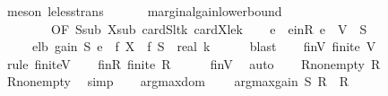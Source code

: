 \begin{isabellebody}
\ {\isacharparenleft}{\kern0pt}meson\ le{\isacharunderscore}{\kern0pt}less{\isacharunderscore}{\kern0pt}trans{\isacharparenright}{\kern0pt}\isanewline
\ \ \isamarkupfalse%
\isanewline
\isanewline
\ \ \isamarkupfalse%
\ marginal{\isacharunderscore}{\kern0pt}gain{\isacharunderscore}{\kern0pt}lower{\isacharunderscore}{\kern0pt}bound{\isacharbrackleft}{\kern0pt}\isanewline
\ \ \ \ \ \ \ \ OF\ S{\isacharunderscore}{\kern0pt}sub{\isacharprime}{\kern0pt}\ X{\isacharunderscore}{\kern0pt}sub\ cardS{\isacharunderscore}{\kern0pt}lt{\isacharunderscore}{\kern0pt}k\ cardX{\isacharunderscore}{\kern0pt}le{\isacharunderscore}{\kern0pt}k{\isacharbrackright}{\kern0pt}\isanewline
\ \ \isamarkupfalse%
\ e\ \ e{\isacharunderscore}{\kern0pt}inR{\isacharcolon}{\kern0pt}\ {\isachardoublequoteopen}e\ {\isasymin}\ V\ {\isacharminus}{\kern0pt}\ {\isacharquery}{\kern0pt}S{\isachardoublequoteclose}\isanewline
\ \ \ \ \ e{\isacharunderscore}{\kern0pt}lb{\isacharcolon}{\kern0pt}\ {\isachardoublequoteopen}gain\ {\isacharquery}{\kern0pt}S\ e\ {\isasymge}\ {\isacharparenleft}{\kern0pt}f\ X\ {\isacharminus}{\kern0pt}\ f\ {\isacharquery}{\kern0pt}S{\isacharparenright}{\kern0pt}\ {\isacharslash}{\kern0pt}\ real\ k{\isachardoublequoteclose}\isanewline
\ \ \ \ \isamarkupfalse%
\ blast\isanewline
\isanewline
\ \ \isamarkupfalse%
\ finV{\isacharcolon}{\kern0pt}\ {\isachardoublequoteopen}finite\ V{\isachardoublequoteclose}\isanewline
\ \ \ \ \isamarkupfalse%
\ {\isacharparenleft}{\kern0pt}rule\ finite{\isacharunderscore}{\kern0pt}V{\isacharparenright}{\kern0pt}\isanewline
\isanewline
\ \ \isamarkupfalse%
\ finR{\isacharcolon}{\kern0pt}\ {\isachardoublequoteopen}finite\ {\isacharquery}{\kern0pt}R{\isachardoublequoteclose}\isanewline
\ \ \ \ \isamarkupfalse%
\ finV\ \isamarkupfalse%
\ auto\isanewline
\ \ \isamarkupfalse%
\ R{\isacharunderscore}{\kern0pt}nonempty{\isacharprime}{\kern0pt}{\isacharcolon}{\kern0pt}\ {\isachardoublequoteopen}{\isacharquery}{\kern0pt}R\ {\isasymnoteq}\ {\isacharbraceleft}{\kern0pt}{\isacharbraceright}{\kern0pt}{\isachardoublequoteclose}\isanewline
\ \ \ \ \isamarkupfalse%
\ R{\isacharunderscore}{\kern0pt}nonempty\ \isamarkupfalse%
\ simp\isanewline
\isanewline
\ \ \isamarkupfalse%
\ argmax{\isacharunderscore}{\kern0pt}dom{\isacharcolon}{\kern0pt}\isanewline
\ \ \ \ {\isachardoublequoteopen}argmax{\isacharunderscore}{\kern0pt}gain\ {\isacharquery}{\kern0pt}S\ {\isacharquery}{\kern0pt}R\ {\isasymin}\ {\isacharquery}{\kern0pt}R{\isachardoublequoteclose}\isanewline

\end{isabellebody}
